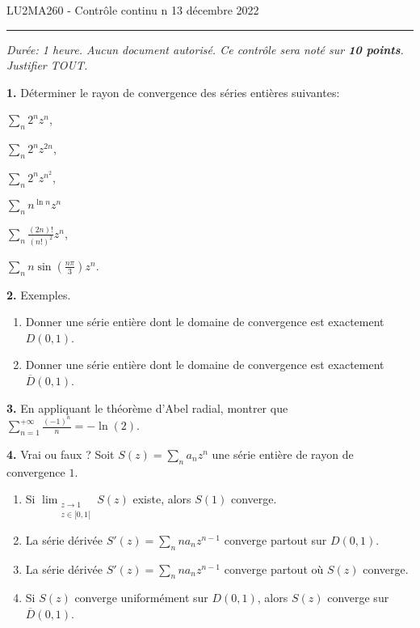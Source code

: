 \documentclass[a4paper,10pt]{article}
\begin{document}
\noindent LU2MA260 - Contrôle continu n
\hfill 13 décembre 2022
\medskip\hrule
\vspace{.3in}

\emph{Durée: 1 heure. Aucun document autorisé.
Ce contrôle sera noté sur \textbf{10 points}. Justifier TOUT.}


\vspace{.1in}
\noindent
\textbf{1.}
Déterminer le rayon de convergence des séries entières suivantes:
\begin{enumerate}[label=\alph*)]
\begin{minipage}{0.4\linewidth}
    \item $\sum_n 2^nz^n$,
    \item $\sum_n 2^nz^{2n}$,
    \item $\sum_n 2^nz^{n^2}$,
\end{minipage}
\begin{minipage}{0.4\linewidth}
    \item $\sum_n n^{\ln n}z^n$
    \item $\sum_n \frac{(2n)!}{(n!)^2}z^n$,
    \item $\sum_n n\sin(\frac{n\pi}{3})z^n$.
\end{minipage}
\end{enumerate}


\vspace{.1in}
\noindent
\textbf{2.} Exemples.
\begin{enumerate}[label=\alph*)]
    \item Donner une série entière dont le domaine de convergence est exactement $D(0,1)$.
    \item Donner une série entière dont le domaine de convergence est exactement $\overline{D}(0,1)$.
\end{enumerate}

\vspace{.1in}
\noindent
\textbf{3.}
En appliquant le théorème d'Abel radial,
montrer que $\sum_{n=1}^{+\infty} \frac{(-1)^n}{n}=-\ln(2)$.

\vspace{.1in}
\noindent
\textbf{4.}
Vrai ou faux ?
Soit $S(z)=\sum_n a_nz^n$ une série entière de rayon de convergence $1$.
\begin{enumerate}[label=\alph*)]
    \item Si $\lim_{\substack{z\to 1\\z\in[0,1[}}S(z)$ existe, alors $S(1)$ converge.
    \item La série dérivée $S'(z)=\sum_n na_nz^{n-1}$ converge partout sur $D(0,1)$.
    \item La série dérivée $S'(z)=\sum_n na_nz^{n-1}$ converge partout où $S(z)$ converge.
    \item Si $S(z)$ converge uniformément sur $D(0,1)$, alors $S(z)$ converge sur $\overline{D}(0,1)$.
\end{enumerate}
\end{document}
